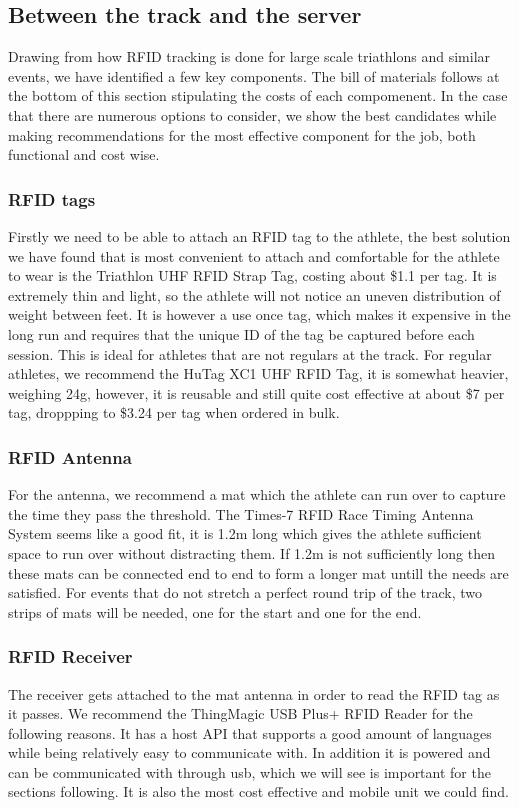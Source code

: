 \documentclass{article}
\begin{document}
\subsection{Between the track and the server}
Drawing from how RFID tracking is done for large scale triathlons and similar events, we have identified a few key components. The bill of materials follows at the bottom of this section stipulating the costs of each compomenent. In the case that there are numerous options to consider, we show the best candidates while making recommendations for the most effective component for the job, both functional and cost wise.

\subsubsection{RFID tags}
Firstly we need to be able to attach an RFID tag to the athlete, the best solution we have found that is most convenient to attach and comfortable for the athlete to wear is the Triathlon UHF RFID Strap Tag, costing about \$1.1 per tag. It is extremely thin and light, so the athlete will not notice an uneven distribution of weight between feet. It is however a use once tag, which makes it expensive in the long run and requires that the unique ID of the tag be captured before each session. This is ideal for athletes that are not regulars at the track. For regular athletes, we recommend the HuTag XC1 UHF RFID Tag, it is somewhat heavier, weighing 24g, however, it is reusable and still quite cost effective at about \$7 per tag, droppping to \$3.24 per tag when ordered in bulk.

\subsubsection{RFID Antenna}
For the antenna, we recommend a mat which the athlete can run over to capture the time they pass the threshold. The Times-7 RFID Race Timing Antenna System seems like a good fit, it is 1.2m long which gives the athlete sufficient space to run over without distracting them. If 1.2m is not sufficiently long then these mats can be connected end to end to form a longer mat untill the needs are satisfied. For events that do not stretch a perfect round trip of the track, two strips of mats will be needed, one for the start and one for the end.

\subsubsection{RFID Receiver}
The receiver gets attached to the mat antenna in order to read the RFID tag as it passes. We recommend the ThingMagic USB Plus+ RFID Reader for the following reasons. It has a host API that supports a good amount of languages while being relatively easy to communicate with. In addition it is powered and can be communicated with through usb, which we will see is important for the sections following. It is also the most cost effective and mobile unit we could find.
\end{document}
